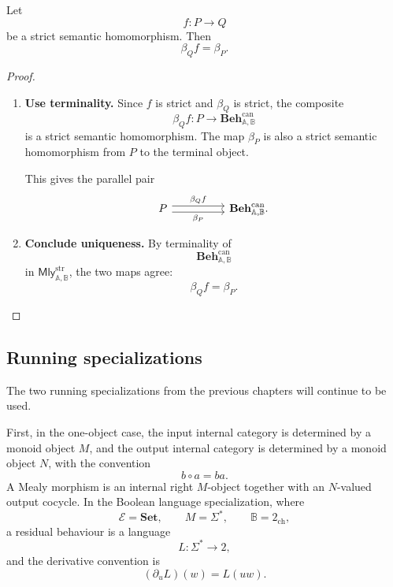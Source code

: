 \begin{lemma}
\label{lem:coeq-strict-maps-preserve-beta}
    Let
    \[
        f:P\to Q
    \]
    be a strict semantic homomorphism. Then
    \[
        \beta_Qf=\beta_P.
    \]
\end{lemma}

\begin{proof}
    \leavevmode
    \begin{enumerate}
        \item \textbf{Use terminality.}
        Since \(f\) is strict and \(\beta_Q\) is strict, the composite
        \[
            \beta_Qf:P\to\mathbf{Beh}^{\mathrm{can}}_{\mathbb A,\mathbb B}
        \]
        is a strict semantic homomorphism. The map \(\beta_P\) is also a strict
        semantic homomorphism from \(P\) to the terminal object.

        This gives the parallel pair
        \[
        \begin{tikzcd}[column sep=huge, row sep=large]
            P
                \arrow[r, shift left=0.65ex, "\beta_Qf"]
                \arrow[r, shift right=0.65ex, "\beta_P"']
            &
            \mathbf{Beh}^{\mathrm{can}}_{\mathbb A,\mathbb B}.
        \end{tikzcd}
        \]

        \item \textbf{Conclude uniqueness.}
        By terminality of
        \[
            \mathbf{Beh}^{\mathrm{can}}_{\mathbb A,\mathbb B}
        \]
        in \(\mathsf{Mly}^{\mathrm{str}}_{\mathbb A,\mathbb B}\), the two maps
        agree:
        \[
            \beta_Qf=\beta_P.
        \]
    \end{enumerate}
\end{proof}

\subsection{Running specializations}
\label{subsec:coeq-overview-running-specializations}

The two running specializations from the previous chapters will continue to be
used.

First, in the one-object case, the input internal category is determined by a
monoid object \(M\), and the output internal category is determined by a monoid
object \(N\), with the convention
\[
    b\circ a=ba.
\]
A Mealy morphism is an internal right \(M\)-object together with an
\(N\)-valued output cocycle. In the Boolean language specialization, where
\[
    \mathcal E=\mathbf{Set},
    \qquad
    M=\Sigma^*,
    \qquad
    \mathbb B=2_{\mathrm{ch}},
\]
a residual behaviour is a language
\[
    L:\Sigma^*\to 2,
\]
and the derivative convention is
\[
    (\partial_uL)(w)=L(uw).
\]

